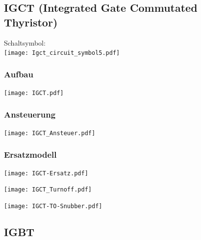 \documentclass[german]{latex4ei_fs}
\begin{document}
\begin{sectionbox}
\subsection{IGCT (Integrated Gate Commutated Thyristor)}
Schaltsymbol: \\
\texttt{[image: Igct\_circuit\_symbol5.pdf]}

\end{sectionbox}

\begin{sectionbox}

\subsubsection*{Aufbau}
\texttt{[image: IGCT.pdf]}
\end{sectionbox}
\begin{sectionbox}
\subsubsection*{Ansteuerung}
\texttt{[image: IGCT\_Ansteuer.pdf]}
\end{sectionbox}
\begin{sectionbox}
\subsubsection*{Ersatzmodell}
\texttt{[image: IGCT-Ersatz.pdf]}

\end{sectionbox}
\begin{sectionbox}
\texttt{[image: IGCT\_Turnoff.pdf]}

\end{sectionbox}
\begin{sectionbox}
\texttt{[image: IGCT-TO-Snubber.pdf]}

\end{sectionbox}



\subsection{IGBT}
\end{document}
